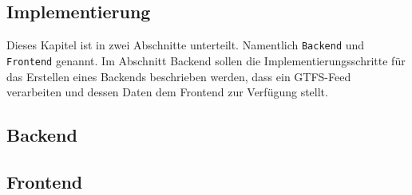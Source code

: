 \begin{newpage}
\section{Implementierung}
\label{sec:implementierung}
  Dieses Kapitel ist in zwei Abschnitte unterteilt. Namentlich \texttt{Backend} und \texttt{Frontend} genannt. Im Abschnitt Backend sollen die Implementierungsschritte für das Erstellen eines Backends beschrieben werden, dass ein GTFS-Feed verarbeiten und dessen Daten dem Frontend zur Verfügung stellt.

  \subsection{Backend}
  \label{sub:backend}

    
    
    
    
    

  \subsection{Frontend}
  \label{sub:frontend}
    

\end{newpage}